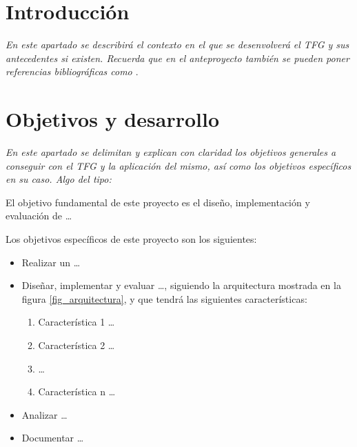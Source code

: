 
\section{Introducción}
\label{sec:introduccion}

\textit{En este apartado se describirá el contexto en el que se desenvolverá el
  TFG y sus antecedentes si existen. Recuerda que en el anteproyecto
  también se pueden poner referencias bibliográficas como \cite{moore2002}}.


\section{Objetivos y desarrollo}
\label{sec:objetivos-y-campo}

\textit{En este apartado se delimitan y explican con claridad los objetivos
  generales a conseguir con el TFG y la aplicación del mismo, así como los
  objetivos específicos en su caso. Algo del tipo:}

El objetivo fundamental de este proyecto es el diseño, implementación y
evaluación de \ldots

Los objetivos específicos de este proyecto son los siguientes:

\begin{itemize}
\item Realizar un  \ldots
\item Diseñar, implementar y evaluar  \ldots, siguiendo la arquitectura
  mostrada en la figura \ref{fig_arquitectura}, y que tendrá las
  siguientes características:

  \begin{enumerate}
  \item Característica 1 \ldots
  \item Característica 2 \ldots
  \item  \ldots
  \item Característica n \ldots
  \end{enumerate}

\item Analizar  \ldots

\item Documentar  \ldots

\end{itemize}

